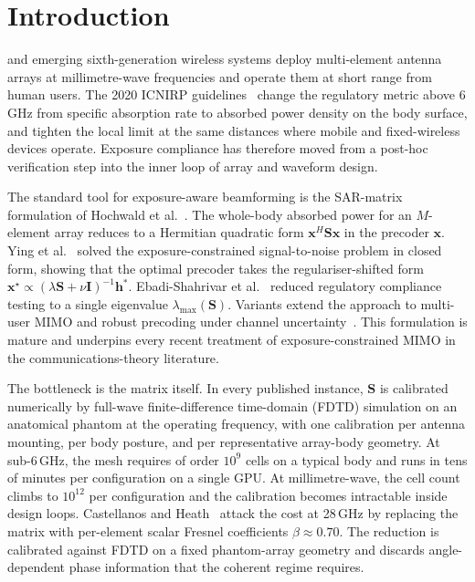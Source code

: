 \documentclass[journal,twocolumn,10pt]{IEEEtran}
\theoremstyle{plain}
\theoremstyle{remark}
\newcommand{\xx}{\mathbf{x}}
\newcommand{\hh}{\mathbf{h}}
\begin{document}
\IEEEpeerreviewmaketitle

\section{Introduction}\label{sec:intro}
 and emerging sixth-generation
wireless systems deploy multi-element antenna arrays at
millimetre-wave frequencies and operate them at short range from
human users. The 2020 ICNIRP guidelines~\cite{ICNIRP2020} change the
regulatory metric above 6\,GHz from specific absorption rate to
absorbed power density on the body surface, and tighten the local
limit at the same distances where mobile and fixed-wireless devices
operate. Exposure compliance has therefore moved from a post-hoc
verification step into the inner loop of array and waveform design.

The standard tool for exposure-aware beamforming is the SAR-matrix
formulation of Hochwald et al.~\cite{Hochwald2014}. The whole-body
absorbed power for an $M$-element array reduces to a Hermitian
quadratic form $\xx^H \mathbf{S} \xx$ in the precoder $\xx$.
Ying et al.~\cite{Ying2015} solved the exposure-constrained
signal-to-noise problem in closed form, showing that the optimal
precoder takes the regulariser-shifted form
$\xx^\star \propto (\lambda \mathbf{S} + \nu \mathbf{I})^{-1}\hh^*$.
Ebadi-Shahrivar et al.~\cite{Ebadi2019} reduced regulatory compliance
testing to a single eigenvalue $\lambda_{\max}(\mathbf{S})$. Variants
extend the approach to multi-user MIMO and robust precoding under
channel uncertainty~\cite{Ying2017}. This formulation is mature and
underpins every recent treatment of exposure-constrained MIMO in
the communications-theory literature.

The bottleneck is the matrix itself. In every
published instance, $\mathbf{S}$ is calibrated numerically by
full-wave finite-difference time-domain (FDTD) simulation on an
anatomical phantom at the operating frequency, with one calibration
per antenna mounting, per body posture, and per representative
array-body geometry. At sub-6\,GHz, the mesh requires of order
$10^9$ cells on a typical body and runs in tens of minutes per
configuration on a single GPU. At millimetre-wave, the cell count
climbs to $10^{12}$ per configuration and the calibration becomes
intractable inside design loops. Castellanos and
Heath~\cite{Castellanos2020} attack the cost at 28\,GHz by replacing
the matrix with per-element scalar Fresnel coefficients
$\beta \approx 0.70$. The reduction is calibrated against FDTD on a
fixed phantom-array geometry and discards angle-dependent phase
information that the coherent regime requires.
\end{document}
